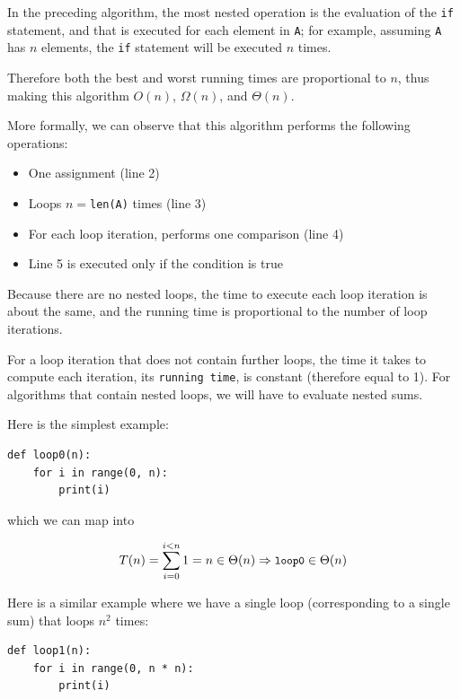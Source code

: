 \documentclass[justified, sixbynine]{tufte-book}
\def\ft{\small\tt}
\theoremstyle{plain}%
\newtheorem * {corollary}{Corollary}
\theoremstyle{definition}
\theoremstyle{remark}
\newtheorem * {remark}{Remark}
\newtheorem * {note}{Note}
\begin{document}
\begin{fullwidth}
In the preceding algorithm, the most nested operation is the evaluation of the {\ft if} statement, and that is executed for each element in {\ft A}; for example, assuming {\ft A} has $n$ elements, the {\ft if} statement will be executed $n$ times.

Therefore both the best and worst running times are proportional to $n$, thus making this algorithm $O(n)$, $\Omega(n)$, and $\Theta(n)$.

More formally, we can observe that this algorithm performs the following operations:

\begin{itemize}
\item  One assignment (line 2)

\item  Loops $n=${\ft len(A)} times (line 3)

\item  For each loop iteration, performs one comparison (line 4)

\item  Line 5 is executed only if the condition is true
\end{itemize}

Because there are no nested loops, the time to execute each loop iteration is about the same, and the running time is proportional to the number of loop iterations.

For a loop iteration that does not contain further loops, the time it takes to compute each iteration, its {\ft running time}, is constant (therefore equal to 1). For algorithms that contain nested loops, we will have to evaluate nested sums.

Here is the simplest example:

\begin{lstlisting}
def loop0(n):
    for i in range(0, n):
        print(i)
\end{lstlisting}

which we can map into

\begin{equation}
T(n)=\sum_{i=0}^{i<n}1=n\in \Theta (n)\Rightarrow \text{{\ft loop0}}\in
\Theta (n)
\end{equation}

Here is a similar example where we have a single loop (corresponding to a single sum) that loops $n^2$ times:

\begin{lstlisting}
def loop1(n):
    for i in range(0, n * n):
        print(i)
\end{lstlisting}


\end{fullwidth}
\end{document}
